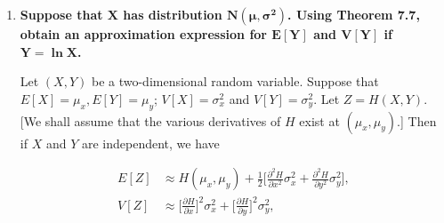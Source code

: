 \documentclass[10pt, oneside]{article}
\begin{document}
\begin{enumerate}[label=9.\arabic*]
Since $V \sim N(0,25)$, we must have pdf

\[ f(v) = \frac{1}{5 \sqrt{2\pi }} \exp \bigg[ -\frac{1}{2} \bigg( \frac{v}{5} \bigg)^2 \bigg] \]

We first derive what the pdf of $V^2$ is. Let $K' = V^2$. Since we know that squared random variables must have pdf of the form

\[ g(k') = \frac{1}{2 \sqrt{k'}} (f(\sqrt{k'}) + f(-\sqrt{k'})) \]

we must have

\begin{align*}
g(k') &= \frac{1}{2 \sqrt{k'}} \frac{2}{5 \sqrt{2\pi}} \exp \bigg[ -\frac{1}{2} \frac{k'}{25} \bigg] \\
&= \frac{1}{5 \sqrt{2 \pi k'}} \exp \bigg[ -\frac{k'}{50} \bigg] 
\end{align*}

Finally, let $K = 500 K'$. As this is a monotone function of $K'$, we may write $K' = K/500$, and conclude

\begin{align*}
h(k) &= \frac{1}{2500 \sqrt{2\pi k / 500}} \exp \bigg[ -\frac{k}{25000} \bigg] \\
&= \boxed{ \frac{1}{250} \sqrt{\frac{5}{2\pi}} \frac{1}{\sqrt{k}} \exp \bigg[ -\frac{k}{25000} \bigg], \quad k > 0 }
\end{align*}

Thus we may calculate $\boxed{P(K < 200) \approx 0.1, P(K > 800) \approx 0.8}$.

\item  \begin{tcolorbox}[
  colback=Cerulean!5!white,
  colframe=Cerulean!75!black]
\textbf{Suppose that $\bm{X}$ has distribution $\bm{N(\mu, \sigma^2)}$. Using Theorem 7.7, obtain an approximation expression for $\bm{E[Y]}$ and $\bm{V[Y]}$ if $\bm{Y = \ln X}$.}
\end{tcolorbox}

\begin{thm}
Let $(X,Y)$ be a two-dimensional random variable. Suppose that $E[X] = \mu_x, E[Y] = \mu_y$; $V[X] = \sigma^2_x$ and $V[Y] = \sigma^2_y$. Let $Z = H(X,Y)$. [We shall assume that the various derivatives of $H$ exist at $(\mu_x, \mu_y)$.] Then if $X$ and $Y$ are independent, we have

\begin{align*}
E[Z] &\approx H(\mu_x, \mu_y) + \frac{1}{2} \bigg[ \frac{\partial^2 H}{\partial x^2} \sigma^2_x + \frac{\partial^2 H}{\partial y^2} \sigma^2_y \bigg], \\
V[Z] &\approx \bigg[ \frac{\partial H}{\partial x} \bigg]^2 \sigma^2_x + \bigg[ \frac{\partial H}{\partial y} \bigg]^2 \sigma^2_y,
\end{align*}


\end{thm}
\end{enumerate}
\end{document}
